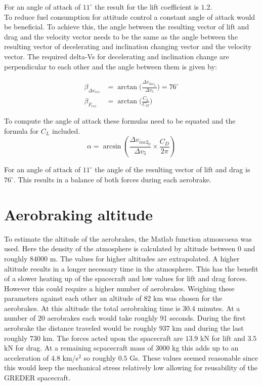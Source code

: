 For an angle of attack of $11^\circ$ the result for the lift coefficient is $1.2$.\\

To reduce fuel consumption for attitude control a constant angle of attack would be beneficial. To achieve this, the angle between the resulting vector of lift and drag and the velocity vector needs to be the same as the angle between the resulting vector of decelerating and inclination changing vector and the velocity vector. The required delta-Vs for decelerating and inclination change are perpendicular to each other and the angle between them is given by:

\begin{align}
	\beta_{\Delta v_{res}}&=\arctan\bigg(\frac{\Delta v_{inc_{2_p}}}{\Delta v_5}\bigg) = 76^\circ\\
	\beta_{F_{res}} &= \arctan\bigg(\frac{C_L}{C_D}\bigg)
\end{align}

To compute the angle of attack these formulas need to be equated and the formula for $C_L$ included.\\

\begin{equation}
	\alpha = \arcsin(\frac{\Delta v_{inc2_p}}{\Delta v_5}\times \frac{C_D}{2\pi})
\end{equation}

For an angle of attack of $11^\circ$ the angle of the resulting vector of lift and drag is $76^\circ$. This results in a balance of both forces during each aerobrake.

\section{Aerobraking altitude}

\qquad To estimate the altitude of the aerobrakes, the Matlab function atmoscoesa was used. Here the density of the atmosphere is calculated by altitude between $0$ and roughly $84000$ m. The values for higher altitudes are extrapolated. A higher altitude results in a longer necessary time in the atmosphere. This has the benefit of a slower heating up of the spacecraft and low values for lift and drag forces. However this could require a higher number of aerobrakes. Weighing these parameters against each other an altitude of $82$ km was chosen for the aerobrakes. At this altitude the total aerobraking time is $30.4$ minutes. At a number of $20$ aerobrakes each would take roughly 91 seconds. During the first aerobrake the distance traveled would be roughly $937$ km and during the last roughly $730$ km. The forces acted upon the spacecraft are $13.9$ kN for lift and $3.5$ kN for drag. At a remaining scpacecraft mass of $3000$ kg this adds up to an acceleration of $4.8$ km/s$^2$ so roughly $0.5$ Gs. These values seemed reasonable since this would keep the mechanical stress relatively low allowing for reusability of the GREDER spacecraft.


